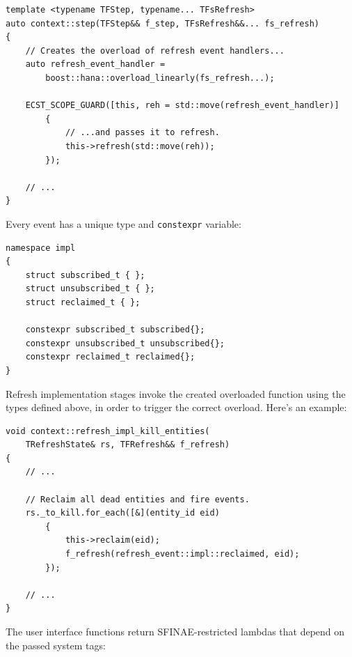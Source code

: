 \documentclass[twoside, 12pt, a4paper, openany]{book}
\begin{document}
\begin{verbatim}
template <typename TFStep, typename... TFsRefresh>
auto context::step(TFStep&& f_step, TFsRefresh&&... fs_refresh)
{
    // Creates the overload of refresh event handlers...
    auto refresh_event_handler =
        boost::hana::overload_linearly(fs_refresh...);

    ECST_SCOPE_GUARD([this, reh = std::move(refresh_event_handler)]
        {
            // ...and passes it to refresh.
            this->refresh(std::move(reh));
        });

    // ...
}
\end{verbatim}

Every event has a unique type and
\texttt{constexpr}
variable:

\begin{verbatim}
namespace impl
{
    struct subscribed_t { };
    struct unsubscribed_t { };
    struct reclaimed_t { };

    constexpr subscribed_t subscribed{};
    constexpr unsubscribed_t unsubscribed{};
    constexpr reclaimed_t reclaimed{};
}
\end{verbatim}

Refresh implementation stages invoke the created overloaded function
using the types defined above, in order to trigger the correct overload.
Here's an example:

\begin{verbatim}
void context::refresh_impl_kill_entities(
    TRefreshState& rs, TFRefresh&& f_refresh)
{
    // ...

    // Reclaim all dead entities and fire events.
    rs._to_kill.for_each([&](entity_id eid)
        {
            this->reclaim(eid);
            f_refresh(refresh_event::impl::reclaimed, eid);
        });

    // ...
}

\end{verbatim}

The user interface functions return SFINAE-restricted lambdas that
depend on the passed system tags:
\end{document}
